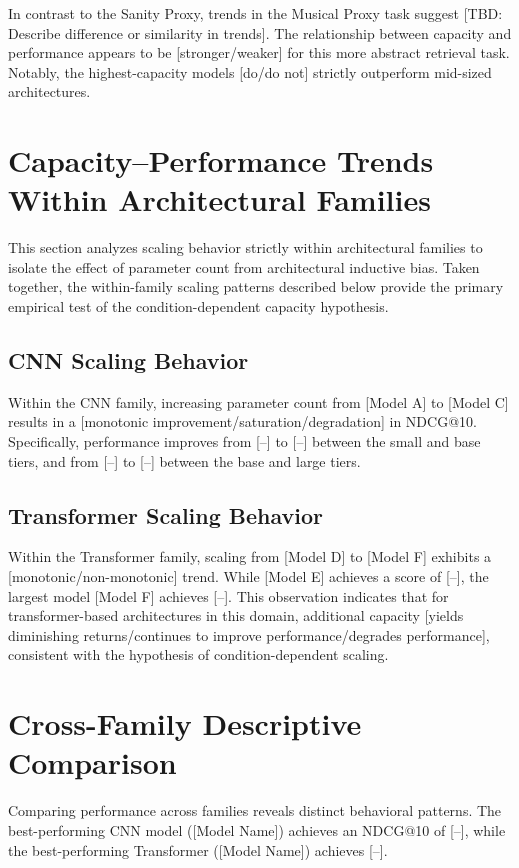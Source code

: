 In contrast to the Sanity Proxy, trends in the Musical Proxy task suggest [TBD: Describe difference or similarity in trends]. The relationship between capacity and performance appears to be [stronger/weaker] for this more abstract retrieval task. Notably, the highest-capacity models [do/do not] strictly outperform mid-sized architectures.

\section{Capacity–Performance Trends Within Architectural Families}
This section analyzes scaling behavior strictly within architectural families to isolate the effect of parameter count from architectural inductive bias.
Taken together, the within-family scaling patterns described below provide the primary empirical test of the condition-dependent capacity hypothesis.


\subsection{CNN Scaling Behavior}
Within the CNN family, increasing parameter count from [Model A] to [Model C] results in a [monotonic improvement/saturation/degradation] in NDCG@10. 
Specifically, performance improves from [--] to [--] between the small and base tiers, and from [--] to [--] between the base and large tiers.

\subsection{Transformer Scaling Behavior}
Within the Transformer family, scaling from [Model D] to [Model F] exhibits a [monotonic/non-monotonic] trend. While [Model E] achieves a score of [--], the largest model [Model F] achieves [--]. This observation indicates that for transformer-based architectures in this domain, additional capacity [yields diminishing returns/continues to improve performance/degrades performance], consistent with the hypothesis of condition-dependent scaling.

\section{Cross-Family Descriptive Comparison}

Comparing performance across families reveals distinct behavioral patterns. The best-performing CNN model ([Model Name]) achieves an NDCG@10 of [--], while the best-performing Transformer ([Model Name]) achieves [--].

